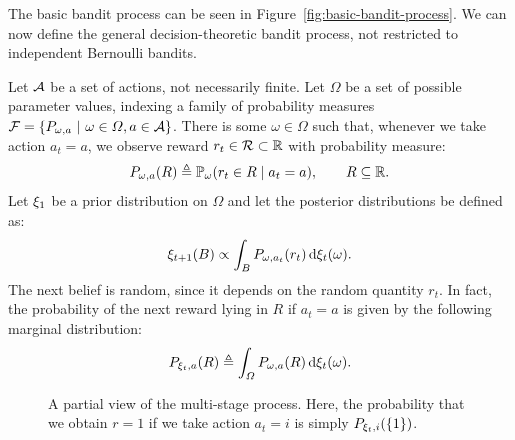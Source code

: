 The basic bandit process can be seen in Figure~\ref{fig:basic-bandit-process}. We can now define the general decision-theoretic bandit process, not restricted to independent Bernoulli bandits.
\begin{definition}
  Let ${\mathcal{A}}$ be a set of actions, not necessarily finite. Let $\Omega$ be a set of possible parameter values, indexing a family of probability measures $\mathcal{F} = \left\{P_{\omega, a} ~\middle|~ \omega \in \Omega, a \in {\mathcal{A}}\right\}$. There is some $\omega \in \Omega$ such that, whenever we take action $a_t = a$, we observe reward $r_t \in {\mathcal{R}} \subset {\mathbb{R}}$ with probability measure:
  \begin{equation}
    \label{eq:bandit-reward-probability}
    P_{\omega,a}(R) \mathrel{\triangleq} \mathop{\mbox{\ensuremath{\mathbb{P}}}}\nolimits_\omega(r_{t} \in R \mid a_t = a),
    \qquad R \subseteq {\mathbb{R}}.
  \end{equation}
  Let $\xi_1$ be a prior distribution on $\Omega$ and let the posterior distributions be defined as:
  \begin{equation}
    \label{eq:bandit-posteriors}
    \xi_{t+1}(B) \propto \int_B P_{\omega, a_t} (r_t) \,\mathrm{d} \xi_t(\omega).
  \end{equation}
  The next belief is random, since it depends on the random quantity $r_t$. In fact, the probability of the next reward lying in $R$ if $a_t = a$ is given by the following marginal distribution:
  \begin{equation}
    \label{eq:dt-bandit-reward-probability}
    P_{\xi_t, a} (R) \mathrel{\triangleq} \int_\Omega P_{\omega,a}(R) \,\mathrm{d}{\xi_t}(\omega).
  \end{equation}
  \begin{figure}[ht]
  \begin{center}
  \end{center}
  \caption{A partial view of the multi-stage process. Here, the probability that we obtain $r=1$ if we take action $a_t = i$ is simply $P_{\xi_t,i}(\{1\})$.}
  \label{fig:multi-stage-bandit}
\end{figure}  


\end{definition}
